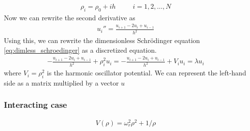 \documentclass{article}
\begin{document}
\begin{align*}
  \rho_i = \rho_0 + ih\;\;\;\;\;\;\;\;\;i=1,2,\dots,N
\end{align*}
Now we can rewrite the second derivative as
\begin{align*}
  u_i'' = \frac{u_{i+1}-2u_i + u_{i-1}}{h^2}
\end{align*}
Using this, we can rewrite the dimensionless Schrödinger equation \eqref{eq:dimless_schroedinger} as a discretized equation.
\begin{align*}
  -\frac{u_{i+1}-2u_i+u_{i-1}}{h^2} + \rho_i^2u_i = -\frac{u_{i+1}-2u_i+u_{i-1}}{h^2} + V_iu_i = \lambda u_i 
\end{align*}
where $V_i = \rho_i^2$ is the harmonic oscillator potential. We can represent the left-hand side as a matrix multiplied by a vector $u$
\subsubsection*{Interacting case}
\begin{align*}
  V(\rho) = \omega_r^2\rho^2 + 1/\rho
\end{align*}
\end{document}
